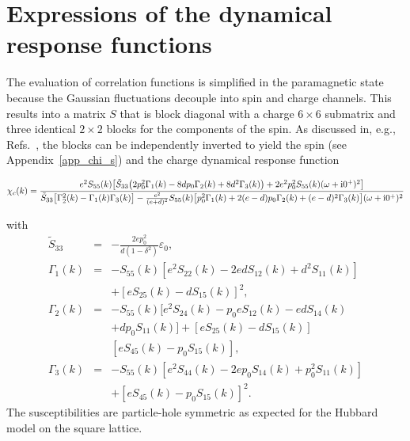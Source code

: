\documentclass[showpacs,amsmath,twocolumn,floatfix]{revtex4-1}
\begin{document}
\section{Expressions of the dynamical response functions} \label{sec:response}

The evaluation of correlation functions is simplified in the paramagnetic state 
because the Gaussian fluctuations decouple into spin and charge channels. This 
results into a matrix $S$ that is block diagonal with a charge $6\times 6$ submatrix 
and three identical $2 \times 2$ blocks for the components of the spin. As discussed 
in, e.g., Refs.~\cite{Lav90,Zim97,li91,li94}, the blocks can be independently inverted to 
yield the spin (see Appendix~\ref{app_chi_s}) and the charge dynamical response 
function
\begin{widetext}
\begin{equation}
 \chi_c(k) = \frac{e^2 S_{55}(k) \big[  \tilde{S}_{33} \big(2 p_0^2 \Gamma_1(k) 
 - 8 d p_0 \Gamma_2(k) + 8 d^2 \Gamma_3(k) \big) + 2 e^2 p_0^2 S_{55}(k) 
 (\omega + {\rm i} 0^+)^2 \big]} {\tilde{S}_{33} \big[\Gamma_2^2(k) - \Gamma_1(k) \Gamma_3(k) \big] 
 -  \frac{e^2}{(e+d)^2} S_{55}(k) \big[ p_0^2  \Gamma_1(k) + 2 (e-d)p_0 \Gamma_2(k) 
 + (e-d)^2 \Gamma_3(k) \big] (\omega + {\rm i} 0^+)^2}
 \label{eq:chi_c}
\end{equation}
\end{widetext}
with
\begin{eqnarray}
 \tilde{S}_{33} &=& -\frac{ 2 e p_0^2 }{d (1 - \delta^2)}  \varepsilon_0, 
 \nonumber \\
 \Gamma_1(k) & = & -S_{55}(k) [ e^2 S_{22}(k) - 2 e d S_{12}(k) + d^2 S_{11}(k) ] 
 \nonumber \\
& & + [e S_{25}(k) - d S_{15}(k)]^2, \nonumber \\
 \Gamma_2(k) & = & -S_{55}(k) [ e^2 S_{24}(k) - p_0 e S_{12}(k) - e d S_{14}(k) 
 \nonumber \\
& & + d p_0 S_{11}(k) ] + [e S_{25}(k) - d S_{15}(k)] \nonumber \\
& & [e S_{45}(k) - p_0 S_{15}(k)], \nonumber \\
 \Gamma_3(k) & = & -S_{55}(k) [ e^2 S_{44}(k) - 2 e p_0 S_{14}(k) + p_0^2 S_{11}(k) ] 
 \nonumber \\
& & + [e S_{45}(k) - p_0 S_{15}(k)]^2.
\end{eqnarray}
The susceptibilities are particle-hole symmetric as expected for the Hubbard 
model on the square lattice. 
\end{document}
